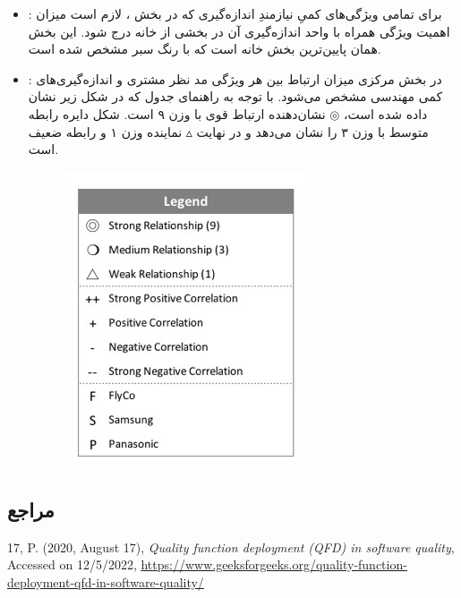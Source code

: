 {\begin{enumerate}[a)]
\begin{itemize}
\item
{}: برای تمامی ویژگی‌های کمیِ نیازمندِ اندازه‌گیری که در بخش ، لازم است میزان اهمیت ویژگی همراه با واحد اندازه‌گیری آن در بخشی از خانه درج شود. این بخش همان پایین‌ترین بخش خانه است که با رنگ سبر مشخص شده است.

\item
{}: در بخش مرکزی میزان ارتباط بین هر ویژگی مد نظر مشتری و اندازه‌گیری‌های کمی مهندسی مشخص می‌شود. با توجه به راهنمای جدول که در شکل زیر نشان داده شده است، $\circledcirc$ نشان‌دهنده ارتباط قوی با وزن ۹ است. شکل دایره رابطه متوسط با وزن ۳ را نشان می‌دهد و در نهایت $\vartriangle$ نماینده وزن ۱ و رابطه ضعیف است.

\begin{figure}[h]
	\centering
	\includegraphics[scale=1.2]{figs/2-2}
\end{figure}

\end{itemize}

\end{enumerate}

\subsection*{مراجع}

\begin{latin}
	\begingroup
	\renewcommand{\section}[2]{}%
	
\begin{thebibliography}{9}
	

	17, P. (2020, August 17),
	\textit{Quality function deployment (QFD) in software quality},
	Accessed on 12/5/2022, 
	\url{https://www.geeksforgeeks.org/quality-function-deployment-qfd-in-software-quality/}

\end{thebibliography}
\endgroup
\end{latin}

}
\newpage
